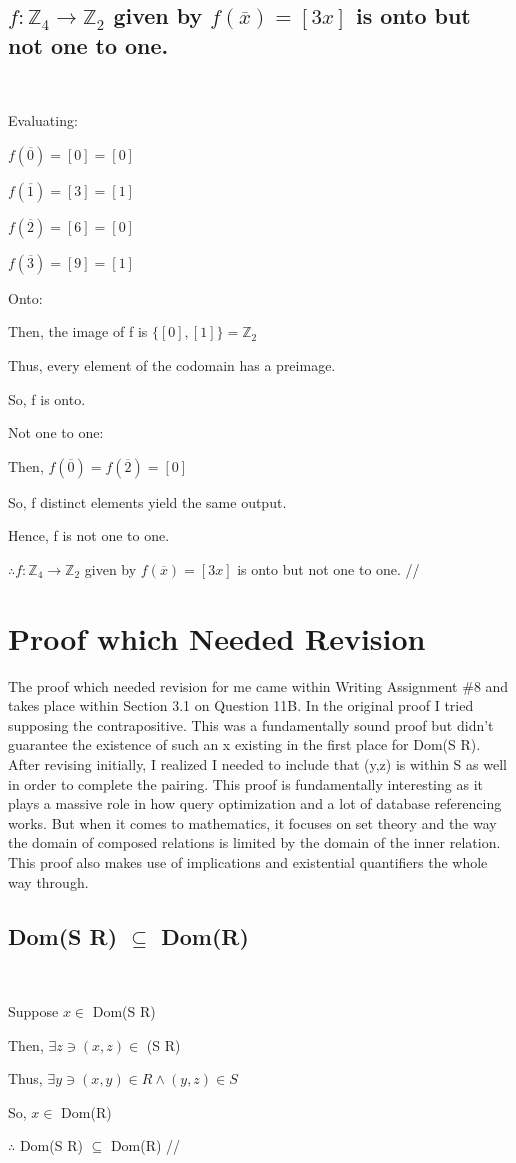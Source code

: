 \documentclass{article}
\begin{document}
\subsection{$f: \mathbb{Z}_4 \rightarrow \mathbb{Z}_2$ given by $f(\overline{x})=[3x]$ is onto but not one to one.}
\
\begin{center}
\raggedright
Evaluating:

$f(\overline{0})=[0]=[0]$

$f(\overline{1})=[3]=[1]$

$f(\overline{2})=[6]=[0]$

$ f(\overline{3})=[9]=[1]$

Onto:

Then, the image of f is $\{[0], [1]\}=\mathbb{Z}_2$

Thus, every element of the codomain has a preimage.

So,  f is onto.

Not one to one:

Then, $f(\overline{0})=f(\overline{2})=[0]$

So, f  distinct elements yield the same output.

Hence, f is not one to one.

$\therefore f: \mathbb{Z}_4 \rightarrow \mathbb{Z}_2$ given by $f(\overline{x})=[3x]$ is onto but not one to one.  //
\end{center}

\newpage
\section{Proof which Needed Revision}
\justifying
The proof which needed revision for me came within Writing Assignment \#8 and takes place within Section 3.1 on Question 11B. In the original proof I tried supposing the contrapositive. This was a fundamentally sound proof but didn't guarantee the existence of such an x existing in the first place for Dom(S \textopenbullet R). After revising initially, I realized I needed to include that (y,z) is within S as well in order to complete the pairing. This proof is fundamentally interesting as it plays a massive role in how query optimization and a lot of database referencing works. But when it comes to mathematics, it focuses on set theory and the way the domain of composed relations is limited by the domain of the inner relation. This proof also makes use of implications and existential quantifiers the whole way through.

\newpage
\subsection{Dom(S \textopenbullet R) $\subseteq$ Dom(R)}
\
\begin{center}
\raggedright
Suppose $x \in$ Dom(S \textopenbullet R)

Then, $\exists z \ni (x,z) \in $ (S \textopenbullet R)

Thus, $\exists y \ni (x,y) \in R \wedge (y,z) \in S$

So, $x \in $ Dom(R)

$\therefore$ Dom(S \textopenbullet R) $\subseteq$ Dom(R)  //

\end{center}
\newpage
\end{document}
